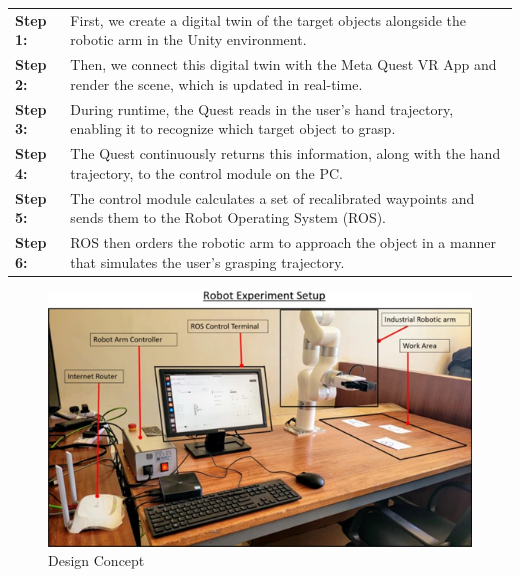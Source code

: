 \documentclass{senior-design-individual}
\begin{document}
\begin{table}[h]
    \centering
    \renewcommand{\arraystretch}{1.5}
    \begin{tabular}{>{\raggedright\arraybackslash}p{1.5cm}p{12cm}}
        \textbf{Step 1:} & First, we create a digital twin of the target objects alongside the robotic arm in the Unity environment. \\
        \textbf{Step 2:} & Then, we connect this digital twin with the Meta Quest VR App and render the scene, which is updated in real-time. \\
        \textbf{Step 3:} & During runtime, the Quest reads in the user's hand trajectory, enabling it to recognize which target object to grasp. \\

        \textbf{Step 4:} & The Quest continuously returns this information, along with the hand trajectory, to the control module on the PC. \\

        \textbf{Step 5:} & The control module calculates a set of recalibrated waypoints and sends them to the Robot Operating System (ROS). \\

        \textbf{Step 6:} & ROS then orders the robotic arm to approach the object in a manner that simulates the user's grasping trajectory. \\
    \end{tabular}
\end{table}
\begin{figure}[h]
    \centering
    \includegraphics[width=0.8\linewidth]{Robot Experiment Setup.png}
    \caption{Design Concept}
\end{figure}
\end{document}
